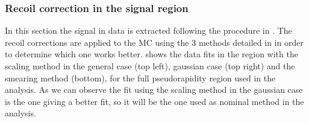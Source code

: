 \clearpage

\subsubsection{Recoil correction in the signal region}\label{sec:WBoson_Analysis_RecoilSignal}

In this section the \W signal in data is extracted following the procedure in . The recoil corrections are applied to the MC using the 3 methods detailed in  in order to determine which one works better.  shows the data fits in the \W region with the scaling method in the general case (top left), gaussian case (top right) and the smearing method (bottom), for the full pseudorapidity region used in the analysis. As we can observe the fit using the scaling method in the gaussian case is the one giving a better fit, so it will be the one used as nominal method in the analysis.

